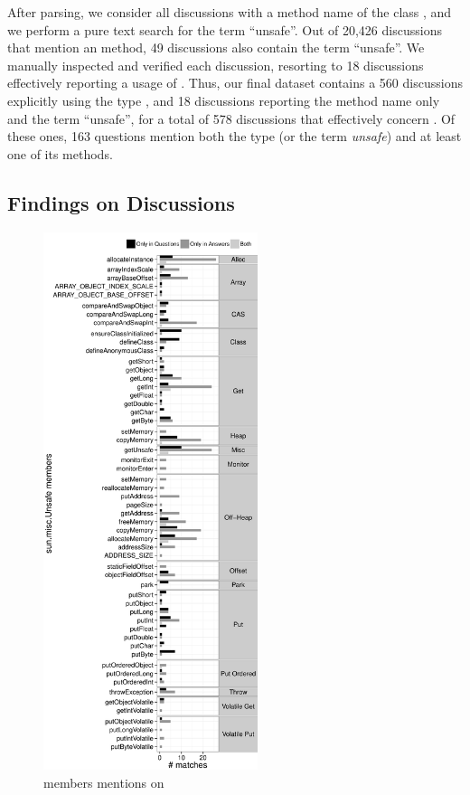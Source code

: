 After parsing, we consider all discussions with a method name of the class \unsafe{},
and we perform a pure text search for the term ``unsafe''.
Out of 20,426 discussions that mention an \unsafe{} method,
49 discussions also contain the term ``unsafe''.
We manually inspected and verified each discussion,
resorting to 18 discussions effectively reporting a usage of \smu{}.
Thus, our final dataset contains a 560 discussions explicitly using the type \unsafe{},
and 18 discussions reporting the method name only and the term ``unsafe'',
for a total of 578 discussions that effectively concern \smu{}.
Of these ones, 163 questions mention both the type (or the term \emph{unsafe}) and at least one of its methods.


\subsection{Findings on \stackoverflow{} Discussions}

\begin{figure}[p]
\centering
\includegraphics[width=0.56\textwidth]{chapters/unsafe/usage-so}
\caption{\smu{} members mentions on \stackoverflow{}}
\label{fig:unsafe:usage-so}
\end{figure}

